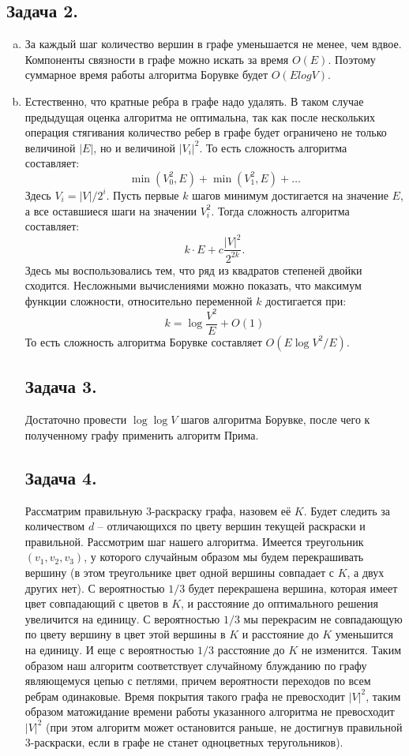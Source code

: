 \documentclass{article}
\begin{document}
\subsection*{Задача 2.}
\begin{enumerate}[a)]
    \item
    За каждый шаг количество вершин в графе уменьшается не менее, чем вдвое.
    Компоненты связности в графе можно искать за время $O(E)$. Поэтому
    суммарное время работы алгоритма Борувке будет $O(E logV)$.
    \item
    Естественно, что кратные ребра в графе надо удалять. В таком случае
    предыдущая оценка алгоритма не оптимальна, так как после нескольких
    операция стягивания количество ребер в графе будет ограничено не только
    величиной $|E|$, но и величиной $|V_i|^2$. То есть сложность алгоритма
    составляет:
    $$
        \min(V_0^2, E) + \min(V_1^2, E) + \ldots
    $$
    Здесь $V_i = |V| / 2^i$. Пусть первые $k$ шагов минимум
    достигается на значение $E$, а все оставшиеся шаги на значении
    $V_i^2$. Тогда сложность алгоритма составляет:
    $$
        k \cdot E + c \frac{|V|^2}{2^{2k}}.
    $$
    Здесь мы воспользовались тем, что ряд из квадратов степеней двойки
    сходится. Несложными вычислениями можно показать, что максимум
    функции сложности, относительно переменной $k$ достигается при:
    $$
        k = \log \frac{V^2}{E} + O(1)
    $$
    То есть сложность алгоритма Борувке составляет $O(E \log V^2 / E)$.

\subsection*{Задача 3.}
Достаточно провести $\log \log V$ шагов алгоритма Борувке, после чего к
полученному графу применить алгоритм Прима.

\subsection*{Задача 4.}
Рассматрим правильную 3-раскраску графа, назовем её $K$.
Будет следить за количеством $d$ -- отличающихся по цвету вершин
текущей раскраски и правильной. Рассмотрим шаг нашего алгоритма.
Имеется треугольник $(v_1, v_2, v_3)$, у которого случайным образом
мы будем перекрашивать вершину (в этом треугольнике цвет одной вершины
совпадает с $K$, а двух других нет). С вероятностью $1/3$ будет перекрашена
вершина, которая имеет цвет совпадающий с цветов в $K$, и расстояние
до оптимального решения увеличится на единицу. С вероятностью $1/3$
мы перекрасим не совпадающую по цвету вершину в цвет этой вершины в $K$
и расстояние до $K$ уменьшится на единицу. И еще с вероятностью $1/3$
расстояние до $K$ не изменится. Таким образом наш алгоритм соответствует
случайному блужданию по графу являющемуся цепью с петлями, причем вероятности
переходов по всем ребрам одинаковые. Время покрытия такого графа
не превосходит $|V|^2$, таким образом матожидание времени работы
указанного алгоритма не превосходит $|V|^2$ (при этом алгоритм может
остановится раньше, не достигнув правильной 3-раскраски, если в графе
не станет одноцветных теругольников).


\end{enumerate}
\end{document}
